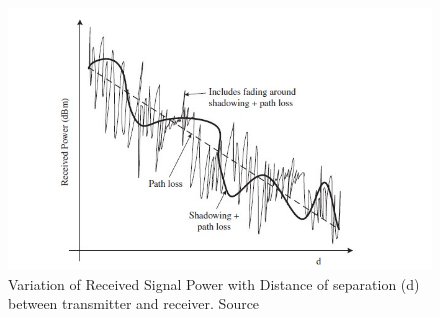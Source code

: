 \begin{figure}[!htbp]
\centering
\includegraphics[scale=1]{Chapter 2/Figures/Path Loss}
\caption[Signal Degradation due to Path Loss and Fading]{Variation of Received Signal Power with Distance of separation (d) between transmitter and receiver. Source \textcite{Ghosh2010}}
\label{fig:path loss}
\end{figure}

